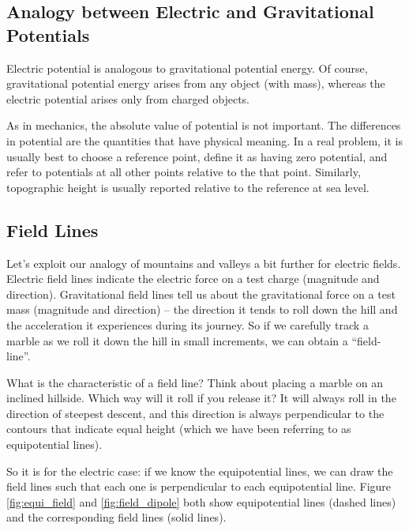 \subsection{Analogy between Electric and Gravitational Potentials}

Electric potential is analogous to gravitational potential energy. Of course, gravitational potential energy arises from any object (with mass), whereas the electric potential arises only from charged objects. \myskip

As in mechanics, the absolute value of potential is not important. The differences in potential are the quantities that have physical meaning. In a real problem, it is usually best to choose a reference point, define it as having zero potential, and refer to potentials at all other points relative to the that point. Similarly, topographic height is usually reported relative to the reference at sea level.

\subsection{Field Lines}

Let's exploit our analogy of mountains and valleys a bit further for electric fields. Electric field lines indicate the electric force on a test charge (magnitude and direction). Gravitational field lines tell us about the gravitational force on a test mass (magnitude and direction) -- the direction it tends to roll down the hill and the acceleration it experiences during its journey. So if we carefully track a marble as we roll it down the hill in small increments, we can obtain a ``field-line''.  \myskip

What is the characteristic of a field line? Think about placing a marble on an inclined hillside.  Which way will it roll if you release it? It will always roll in the direction of steepest descent, and this direction is always perpendicular to the contours that indicate equal height (which we have been referring to as equipotential lines). \myskip

So it is for the electric case: if we know the equipotential lines, we can draw the field lines such that each one is perpendicular to each equipotential line. Figure \ref{fig:equi_field} and \ref{fig:field_dipole} both show equipotential lines (dashed lines) and the corresponding field lines (solid lines).

